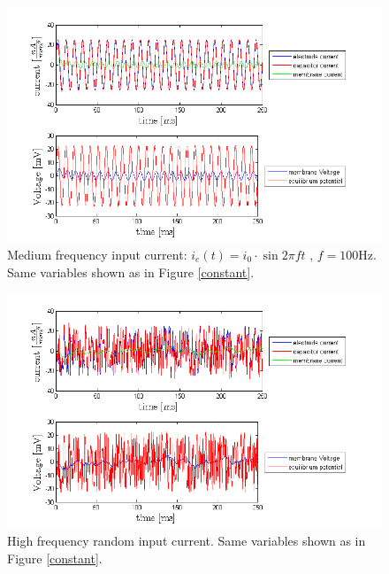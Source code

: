 \documentclass{scrartcl}
\begin{document}
\begin{figure}
\centering
\includegraphics[trim = {1.3cm 0 2cm 0.9cm}, width=\textwidth, clip]{../pics/medium}
\caption{Medium frequency input current: $i_e(t) = i_0 \cdot \sin{2\pi f t}$ , $f = 100\si{\hertz}$. Same variables shown as in Figure \ref{constant}.}
\label{medium}
\end{figure}

\begin{figure}
\centering
\includegraphics[trim = {1.3cm 0 2cm 0.9cm}, width=\textwidth, clip]{../pics/random}
\caption{High frequency random input current. Same variables shown as in Figure \ref{constant}.}
\label{random}
\end{figure}
\end{document}
